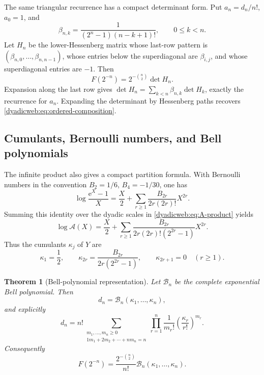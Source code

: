 \documentclass[11pt,oneside]{article}
\newtheorem{theorem}{Theorem}[section]
\theoremstyle{definition}
\theoremstyle{remark}
\newcommand{\e}{\mathrm e}
\begin{document}
The same triangular recurrence has a compact determinant form.  Put
$a_n=d_n/n!$, $a_0=1$, and
\begin{equation}
 \beta_{n,k}=\frac1{(2^n-1)(n-k+1)!},\qquad 0\le k<n.
 \label{dyadicweb:eq:Hessenberg-beta}
\end{equation}
Let $H_n$ be the lower-Hessenberg matrix whose last-row pattern is
$(\beta_{n,0},\ldots,\beta_{n,n-1})$, whose entries below the superdiagonal are
$\beta_{i,j}$, and whose superdiagonal entries are $-1$.  Then
\begin{equation}
 \boxed{F(2^{-n})=2^{-\binom n2}\det H_n.}
 \label{dyadicweb:eq:Hessenberg-determinant}
\end{equation}
Expansion along the last row gives
$\det H_n=\sum_{k<n}\beta_{n,k}\det H_k$, exactly the recurrence for $a_n$.
Expanding the determinant by Hessenberg paths recovers
\eqref{dyadicweb:eq:ordered-composition}.

\subsection{Cumulants, Bernoulli numbers, and Bell polynomials}

The infinite product also gives a compact partition formula.  With Bernoulli numbers in the
convention $B_2=1/6$, $B_4=-1/30$, one has
\begin{equation}
 \log\frac{\e^X-1}{X}
 =\frac X2+\sum_{r\ge1}\frac{B_{2r}}{2r(2r)!}X^{2r}.      \label{dyadicweb:eq:log-exprel}
\end{equation}
Summing this identity over the dyadic scales in \eqref{dyadicweb:eq:A-product} yields
\begin{equation}
 \log\mathscr A(X)
 =\frac X2+
  \sum_{r\ge1}
  \frac{B_{2r}}{2r(2r)!(2^{2r}-1)}X^{2r}.                 \label{dyadicweb:eq:log-A}
\end{equation}
Thus the cumulants $\kappa_j$ of $Y$ are
\begin{equation}
 \kappa_1=\frac12,\qquad
 \kappa_{2r}=\frac{B_{2r}}{2r(2^{2r}-1)},\qquad
 \kappa_{2r+1}=0\quad(r\ge1).                            \label{dyadicweb:eq:Y-cumulants}
\end{equation}

\begin{theorem}[Bell-polynomial representation]
\label{dyadicweb:thm:bell-d}
Let $\mathcal B_n$ be the complete exponential Bell polynomial.  Then
\begin{equation}
 d_n=\mathcal B_n(\kappa_1,\ldots,\kappa_n),               \label{dyadicweb:eq:bell-d}
\end{equation}
and explicitly
\begin{equation}
 d_n=n!\!
 \sum_{\substack{m_1,\ldots,m_n\ge0\\
                  1m_1+2m_2+\cdots+nm_n=n}}
 \prod_{r=1}^{n}\frac1{m_r!}
 \left(\frac{\kappa_r}{r!}\right)^{m_r}.                 \label{dyadicweb:eq:partition-d}
\end{equation}
Consequently
\begin{equation}
 \boxed{
 F(2^{-n})=\frac{2^{-\binom n2}}{n!}
 \mathcal B_n(\kappa_1,\ldots,\kappa_n).}                 \label{dyadicweb:eq:inverse-bell}
\end{equation}
\end{theorem}
\end{document}
